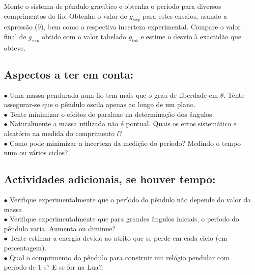 \documentclass[a4paper,twoside,12pt]{article}      %
\begin{document}
Monte o sistema de pêndulo gravítico e obtenha o período para diversos comprimentos do fio. 
Obtenha o valor de $g_{exp}$ para estes ensaios, usando a expressão (9), bem como a respectiva incerteza experimental. 
Compare o valor final de $g_{exp}$ obtido com o valor tabelado $g_{tab}$ e estime o desvio à exactidão que obteve. 

\smallskip

\subsection{\sf Aspectos a ter em conta:}

 \begin{flushleft}
	 $\bullet$ Uma massa pendurada num fio tem mais que o grau de liberdade em $\theta$. Tente assegurar-se que o pêndulo oscila apenas ao longo de um plano. \\
	 $\bullet$ Tente minimizar o efeitos de paralaxe na determinação dos ângulos\\
	 $\bullet$ Naturalmente a massa utilizada não é pontual. Quais os erros sistemático e aleatório na medida do comprimento $l$? \\	
	 $\bullet$ Como pode minimizar a incerteza da medição do período? Medindo o tempo num ou vários ciclos? \\
\end{flushleft} 

\subsection{\sf Actividades adicionais, se houver tempo:}

 \begin{flushleft}
	 $\bullet$ Verifique experimentalmente que o período do pêndulo não depende do valor da massa.\\
	 $\bullet$ Verifique experimentalmente que para grandes ângulos iniciais, o período do pêndulo varia. Aumenta ou diminue?\\
	 $\bullet$ Tente estimar a energia  devido ao atrito que se perde em cada ciclo (em percentagem).\\
	 $\bullet$ Qual o comprimento do pêndulo para construir um relógio pendular com período de 1 s? E se for na Lua?.
\end{flushleft} 

 
\end{document}
